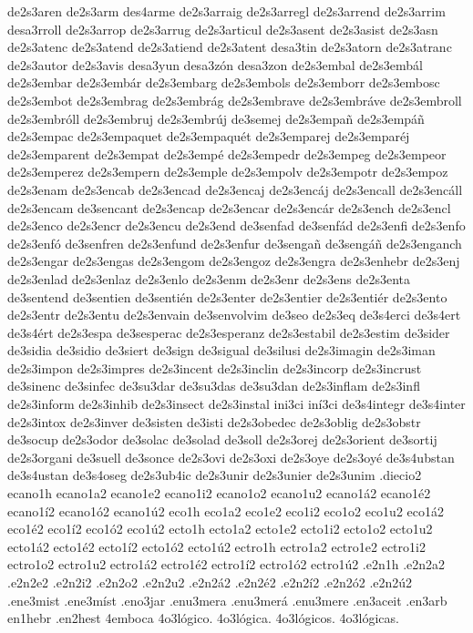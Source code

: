 {de2s3aren
de2s3arm
des4arme
de2s3arraig
de2s3arregl
de2s3arrend
de2s3arrim
desa3rroll
de2s3arrop
de2s3arrug
de2s3articul
de2s3asent
de2s3asist
de2s3asn
de2s3atenc
de2s3atend
de2s3atiend
de2s3atent
desa3tin
de2s3atorn
de2s3atranc
de2s3autor
de2s3avis
desa3yun
desa3zón
desa3zon
de2s3embal
de2s3embál
de2s3embar
de2s3embár
de2s3embarg
de2s3embols
de2s3emborr
de2s3embosc
de2s3embot
de2s3embrag
de2s3embrág
de2s3embrave
de2s3embráve
de2s3embroll
de2s3embróll
de2s3embruj
de2s3embrúj
de3semej
de2s3empañ
de2s3empáñ
de2s3empac
de2s3empaquet
de2s3empaquét
de2s3emparej
de2s3emparéj
de2s3emparent
de2s3empat
de2s3empé
de2s3empedr
de2s3empeg
de2s3empeor
de2s3emperez
de2s3empern
de2s3emple
de2s3empolv
de2s3empotr
de2s3empoz
de2s3enam
de2s3encab
de2s3encad
de2s3encaj
de2s3encáj
de2s3encall
de2s3encáll
de2s3encam
de3sencant
de2s3encap
de2s3encar
de2s3encár
de2s3ench
de2s3encl
de2s3enco
de2s3encr
de2s3encu
de2s3end
de3senfad
de3senfád
de2s3enfi
de2s3enfo
de2s3enfó
de3senfren
de2s3enfund
de2s3enfur
de3sengañ
de3sengáñ
de2s3enganch
de2s3engar
de2s3engas
de2s3engom
de2s3engoz
de2s3engra
de2s3enhebr
de2s3enj
de2s3enlad
de2s3enlaz
de2s3enlo
de2s3enm
de2s3enr
de2s3ens
de2s3enta
de3sentend
de3sentien
de3sentién
de2s3enter
de2s3entier
de2s3entiér
de2s3ento
de2s3entr
de2s3entu
de2s3envain
de3senvolvim
de3seo
de2s3eq
de3s4erci
de3s4ert
de3s4ért
de2s3espa
de3sesperac
de2s3esperanz
de2s3estabil
de2s3estim
de3sider
de3sidia
de3sidio
de3siert
de3sign
de3sigual
de3silusi
de2s3imagin
de2s3iman
de2s3impon
de2s3impres
de2s3incent
de2s3inclin
de2s3incorp
de2s3incrust
de3sinenc
de3sinfec
de3su3dar
de3su3das
de3su3dan
de2s3inflam
de2s3infl
de2s3inform
de2s3inhib
de2s3insect
de2s3instal
ini3ci
iní3ci
de3s4integr
de3s4inter
de2s3intox
de2s3inver
de3sisten
de3isti
de2s3obedec
de2s3oblig
de2s3obstr
de3socup
de2s3odor
de3solac
de3solad
de3soll
de2s3orej
de2s3orient
de3sortij
de2s3organi
de3suell
de3sonce
de2s3ovi
de2s3oxi
de2s3oye
de2s3oyé
de3s4ubstan
de3s4ustan
de3s4oseg
de2s3ub4ic
de2s3unir
de2s3unier
de2s3unim
.diecio2
ecano1h
ecano1a2 ecano1e2 ecano1i2 ecano1o2 ecano1u2
ecano1á2 ecano1é2 ecano1í2 ecano1ó2 ecano1ú2
eco1h
eco1a2 eco1e2 eco1i2 eco1o2 eco1u2
eco1á2 eco1é2 eco1í2 eco1ó2 eco1ú2
ecto1h
ecto1a2 ecto1e2 ecto1i2 ecto1o2 ecto1u2
ecto1á2 ecto1é2 ecto1í2 ecto1ó2 ecto1ú2
ectro1h
ectro1a2 ectro1e2 ectro1i2 ectro1o2 ectro1u2
ectro1á2 ectro1é2 ectro1í2 ectro1ó2 ectro1ú2
.e2n1h
.e2n2a2 .e2n2e2 .e2n2i2 .e2n2o2 .e2n2u2
.e2n2á2 .e2n2é2 .e2n2í2 .e2n2ó2 .e2n2ú2
.ene3mist
.ene3míst
.eno3jar
.enu3mera
.enu3merá
.enu3mere
.en3aceit
.en3arb
en1hebr
.en2hest
4emboca
4o3lógico.
4o3lógica.
4o3lógicos.
4o3lógicas.
}

